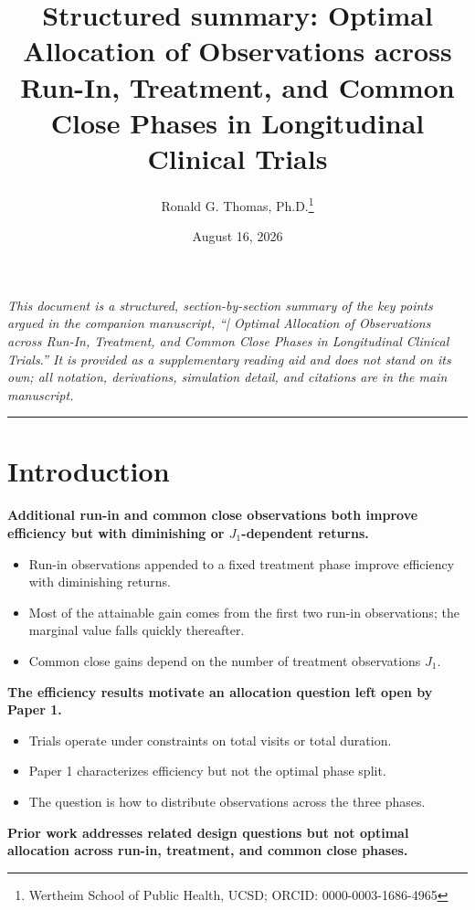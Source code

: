 \documentclass[
  11pt,
]{article}
\title{Structured summary: \textbar{} Optimal Allocation of Observations across Run-In, Treatment, and Common Close Phases in Longitudinal Clinical Trials}
\author{Ronald G. Thomas, Ph.D.\thanks{Wertheim School of Public Health, UCSD; ORCID: 0000-0003-1686-4965}}
\date{August 16, 2026}
\begin{document}
\maketitle

{
\setcounter{tocdepth}{2}
\tableofcontents
}
\emph{This document is a structured, section-by-section summary of the key points argued in the companion manuscript, ``| Optimal Allocation of Observations across Run-In, Treatment, and Common Close Phases in Longitudinal Clinical Trials.'' It is provided as a supplementary reading aid and does not stand on its own; all notation, derivations, simulation detail, and citations are in the main manuscript.}

\bigskip\noindent

\rule{\textwidth}{0.4pt}\bigskip

\section{Introduction}\label{introduction}

\textbf{Additional run-in and common close observations both improve efficiency but with diminishing or $J_1$-dependent returns.}

\begin{itemize}\setlength{\itemsep}{2pt}\setlength{\parskip}{0pt}
\item Run-in observations appended to a fixed treatment phase improve efficiency with diminishing returns.
\item Most of the attainable gain comes from the first two run-in observations; the marginal value falls quickly thereafter.
\item Common close gains depend on the number of treatment observations $J_1$.
\end{itemize}

\textbf{The efficiency results motivate an allocation question left open by Paper 1.}

\begin{itemize}\setlength{\itemsep}{2pt}\setlength{\parskip}{0pt}
\item Trials operate under constraints on total visits or total duration.
\item Paper 1 characterizes efficiency but not the optimal phase split.
\item The question is how to distribute observations across the three phases.
\end{itemize}

\textbf{Prior work addresses related design questions but not optimal allocation across run-in, treatment, and common close phases.}
\end{document}

